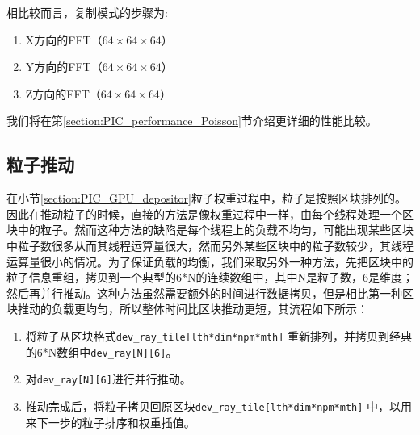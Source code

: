 相比较而言，复制模式的步骤为:
\begin{enumerate}
  \item X方向的FFT（$64 \times 64 \times 64$）
  \item Y方向的FFT（$64 \times 64 \times 64$）
  \item Z方向的FFT（$64 \times 64 \times 64$）
\end{enumerate}

我们将在第\ref{section:PIC_performance_Poisson}节介绍更详细的性能比较。


\subsection{粒子推动}
在小节\ref{section:PIC_GPU_depositor}粒子权重过程中，粒子是按照区块排列的。因此在推动粒子的时候，直接的方法是像权重过程中一样，由每个线程处理一个区块中的粒子。然而这种方法的缺陷是每个线程上的负载不均匀，可能出现某些区块中粒子数很多从而其线程运算量很大，然而另外某些区块中的粒子数较少，其线程运算量很小的情况。为了保证负载的均衡，我们采取另外一种方法，先把区块中的粒子信息重组，拷贝到一个典型的6*N的连续数组中，其中N是粒子数，6是维度；然后再并行推动。这种方法虽然需要额外的时间进行数据拷贝，但是相比第一种区块推动的负载更均匀，所以整体时间比区块推动更短，其流程如下所示：
\begin{enumerate}
  \item 将粒子从区块格式\verb"dev_ray_tile[lth*dim*npm*mth]" 重新排列，并拷贝到经典的6*N数组中\verb"dev_ray[N][6]"。
  \item 对\verb"dev_ray[N][6]"进行并行推动。
  \item 推动完成后，将粒子拷贝回原区块\verb"dev_ray_tile[lth*dim*npm*mth]" 中，以用来下一步的粒子排序和权重插值。
\end{enumerate}



